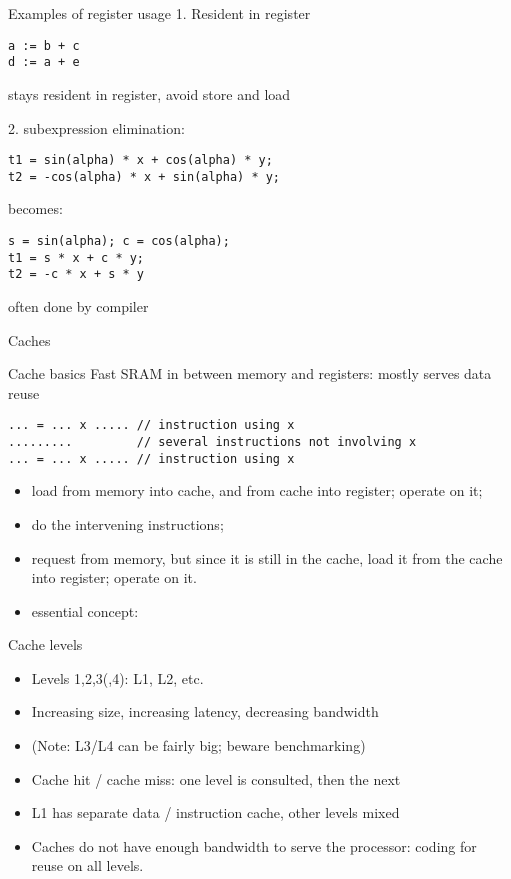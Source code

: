 \begin{numberedframe}{Examples of register usage}
1. Resident in register
\begin{verbatim}
a := b + c
d := a + e
\end{verbatim}
 stays resident in register, avoid store and load  

2. subexpression elimination:
\begin{verbatim}
t1 = sin(alpha) * x + cos(alpha) * y;
t2 = -cos(alpha) * x + sin(alpha) * y;
\end{verbatim}
becomes:
\begin{verbatim}
s = sin(alpha); c = cos(alpha);
t1 = s * x + c * y;
t2 = -c * x + s * y
\end{verbatim}
often done by compiler
\end{numberedframe}

 {Caches}

\begin{numberedframe}{Cache basics}
Fast SRAM in between memory and registers: mostly serves data reuse
\begin{verbatim}
... = ... x ..... // instruction using x
.........         // several instructions not involving x
... = ... x ..... // instruction using x
\end{verbatim}
\begin{itemize}
\item load  from memory into cache, and from cache into register;
  operate on it;
\item do the intervening instructions;
\item request  from memory, but since it is still in the cache,
  load it from the cache into register; operate on it.
\item essential concept: 
\end{itemize}
\end{numberedframe}

\begin{numberedframe}{Cache levels}
  \begin{itemize}
  \item Levels 1,2,3(,4): L1, L2, etc.
  \item Increasing size, increasing latency, decreasing bandwidth
  \item (Note: L3/L4 can be fairly big; beware benchmarking)
  \item Cache hit / cache miss: one level is consulted, then the next
  \item L1 has separate data / instruction cache, other levels mixed
  \item Caches do not have enough bandwidth to serve the processor:
    coding for reuse on all levels.
  \end{itemize}
\end{numberedframe}

